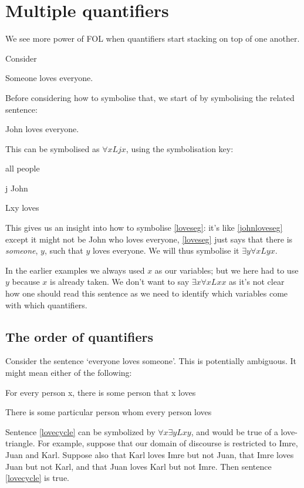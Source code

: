 \chapter{Multiple quantifiers}\label{s:MultipleGenerality}



We see more power of FOL when quantifiers start stacking on top of one another.

Consider \begin{earg}
\item[\ex{loveseg}] Someone loves everyone.
\end{earg}
Before considering how to symbolise that, we start of by symbolising the related sentence:
\begin{earg}
\item[\ex{johnloveseg}] John loves everyone.
\end{earg} This can be symbolised
as $\forall x Ljx$, using the symbolisation key:\begin{ekey}
\item[\text{domain}] all people
\item[j] John
\item[Lxy]  loves 
\end{ekey}
This gives us an insight into how to symbolise \ref{loveseg}: it's like \ref{johnloveseg} except it might not be John who loves everyone, \ref{loveseg} just says that there is \emph{someone}, $y$, such that $y$ loves everyone. We will thus symbolise it $\exists y\forall x Lyx$.

In the earlier examples we always used $x$ as our variables; but we here had to use $y$ because $x$ is already taken. We don't want to say $\exists x\forall xLxx$ as it's not clear how one should read this sentence as we need to identify which variables come with which quantifiers.


\section{The order of quantifiers}
Consider the sentence `everyone loves someone'. This is potentially ambiguous. It might mean either of the following:
	\begin{earg}
		\item[\ex{lovecycle}] For every person x, there is some person that x loves
		\item[\ex{loveconverge}] There is some particular person whom every person loves
	\end{earg}
Sentence \ref{lovecycle} can be symbolized by $\forall x \exists y Lxy$, and would be true of a love-triangle. For example, suppose that our domain of discourse is restricted to Imre, Juan and Karl. Suppose also that Karl loves Imre but not Juan, that Imre loves Juan but not Karl, and that Juan loves Karl but not Imre. Then sentence \ref{lovecycle} is true.

